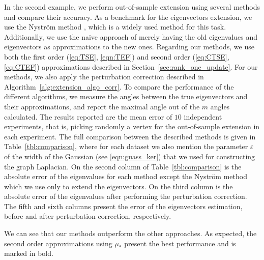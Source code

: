 \documentclass[11pt]{article}
\begin{document}
In the second example, we perform out-of-sample extension using several methods and compare their accuracy. As a benchmark for the eigenvectors extension, we use the Nystr{\"o}m method \cite{bengio2004out}, which is a widely used method for this task. Additionally, we use the naive approach of merely having the old eigenvalues and eigenvectors as approximations to the new ones. Regarding our methods, we use both the first order (\eqref{eq:TSE}, \eqref{eqn:TEF}) and second order (\eqref{eq:CTSE},\eqref{eq:CTEF}) approximations described in Section~\ref{sec:rank_one_update}. For our methods, we also apply the perturbation correction described in Algorithm~\ref{alg:extension_algo_corr}. To compare the performance of the different algorithms, we measure the angles between the true eigenvectors and their approximations, and report the maximal angle out of the $m$ angles calculated. The results reported are the mean error of $10$ independent experiments, that is, picking randomly a vertex for the out-of-sample extension in each experiment. The full comparison between the described methods is given in Table~\ref{tbl:comparison}, where for each dataset we also mention the parameter $\varepsilon$ of the width of the Gaussian (see \eqref{eqn:guass_ker}) that we used for constructing the graph Laplacian. On the second column of Table~\ref{tbl:comparison} is the absolute error of the eigenvalues for each method except the Nystr{\"o}m method which we use only to extend the eigenvectors. On the third column is the absolute error of the eigenvalues after performing the perturbation correction. The fifth and sixth columns present the error of the eigenvectors estimation, before and after perturbation correction, respectively. 

We can see that our methods outperform the other approaches. As expected, the second order approximations using $\mu_{*}$ present the best performance and is marked in bold.
\end{document}
